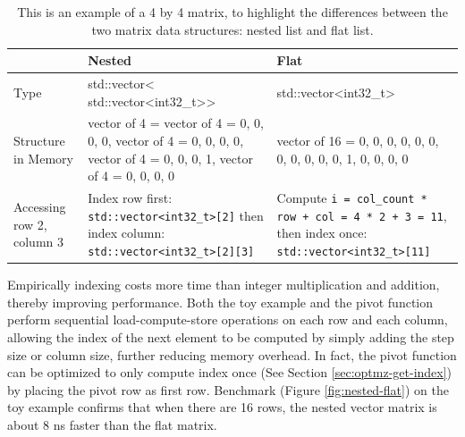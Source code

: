 \documentclass[logo,bsc,singlespacing,parskip]{infthesis}
\newenvironment{VerbatimCompact}
  {\vspace*{-2.5mm}\VerbatimEnvironment
   \par\Verbatim}
  {\endVerbatim\vspace*{-2.4mm}}
\begin{document}
\begin{table}[ht]

\begin{tabular}{%
    >{\raggedright\arraybackslash}p{2cm}%
    >{\raggedright\arraybackslash}p{6.5cm}%
    >{\raggedright\arraybackslash}p{4.5cm}}
    
    \toprule
    & Nested & Flat\\

    \midrule
    
    Type
    &
    \begin{VerbatimCompact}
std::vector<
    std::vector<int32_t>>
    \end{VerbatimCompact}
    &
    \begin{VerbatimCompact}
std::vector<int32_t>
    \end{VerbatimCompact}
    \\

Structure in Memory
    &
    \begin{VerbatimCompact}
vector of 4 = {
    vector of 4 = {0, 0, 0, 0}, 
    vector of 4 = {0, 0, 0, 0}, 
    vector of 4 = {0, 0, 0, 1}, 
    vector of 4 = {0, 0, 0, 0}
}
    \end{VerbatimCompact}
    &
    \begin{VerbatimCompact}
vector of 16 = {
    0, 0, 0, 0, 
    0, 0, 0, 0,
    0, 0, 0, 1, 
    0, 0, 0, 0
}
    \end{VerbatimCompact}
    \\

    Accessing row 2, column 3
    &
    Index row first: \texttt{std::vector<int32\_t>[2]} \linebreak
    then index column: 
        \texttt{std::vector<int32\_t>[2][3]}
    & 
    Compute \texttt{i = 
    \linebreak col\_count * row + col \linebreak = 4 * 2 + 3 =
    11}, \linebreak then index once: \texttt{std::vector<int32\_t>[11]}  \\

    \bottomrule

\end{tabular}
\caption{This is an example of a 4 by 4 matrix, to highlight the differences
between the two matrix data structures: nested list and flat list. }
\label{table:nested-flat}
\end{table}

Empirically indexing costs more time than integer multiplication and addition,
thereby improving performance. Both the toy example and the pivot function
perform sequential load-compute-store operations on each row and each column,
allowing the index of the next element to be computed by simply adding the step
size or column size, further reducing memory overhead. In fact, the pivot
function can be optimized to only compute index once (See Section
\ref{sec:optmz-get-index}) by placing the pivot row as first row. Benchmark
(Figure \ref{fig:nested-flat}) on the toy example confirms that when there are
16 rows, the nested vector matrix is about 8 ns faster than the flat matrix.
\end{document}
